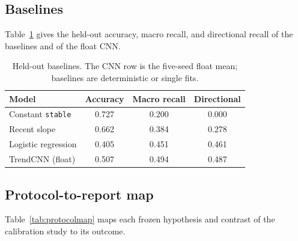 \documentclass[10pt,twocolumn]{article}
\begin{document}
\subsection{Baselines}

Table~\ref{tab:baselines} gives the held-out accuracy, macro recall, and
directional recall of the baselines and of the float CNN.

\begin{table}[!tp]
\centering
\caption{Held-out baselines. The CNN row is the five-seed float mean;
baselines are deterministic or single fits.}
\label{tab:baselines}
\footnotesize
\begin{tabular}{@{}lccc@{}}
\toprule
Model & Accuracy & Macro recall & Directional \\
\midrule
Constant \texttt{stable} & 0.727 & 0.200 & 0.000 \\
Recent slope & 0.662 & 0.384 & 0.278 \\
Logistic regression & 0.405 & 0.451 & 0.461 \\
TrendCNN (float) & 0.507 & 0.494 & 0.487 \\
\bottomrule
\end{tabular}
\end{table}

\subsection{Protocol-to-report map}

Table~\ref{tab:protocolmap} maps each frozen hypothesis and contrast of
the calibration study to its outcome.
\end{document}
